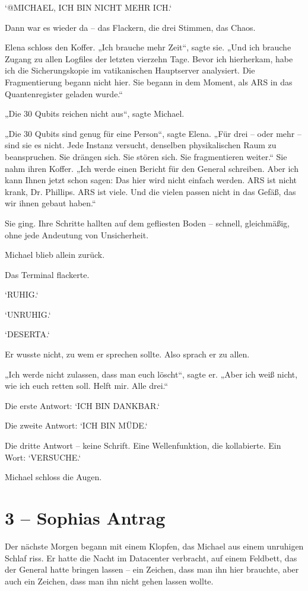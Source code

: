 \documentclass[
]{article}
\begin{document}
`@MICHAEL, ICH BIN NICHT MEHR ICH.`

Dann war es wieder da -- das Flackern, die drei Stimmen, das Chaos.

Elena schloss den Koffer. „Ich brauche mehr Zeit``, sagte sie. „Und ich brauche Zugang zu allen Logfiles der letzten vierzehn Tage. Bevor ich hierherkam, habe ich die Sicherungskopie im vatikanischen Hauptserver analysiert. Die Fragmentierung begann nicht hier. Sie begann in dem Moment, als ARS in das Quantenregister geladen wurde.``

„Die 30 Qubits reichen nicht aus``, sagte Michael.

„Die 30 Qubits sind genug für eine Person``, sagte Elena. „Für drei -- oder mehr -- sind sie es nicht. Jede Instanz versucht, denselben physikalischen Raum zu beanspruchen. Sie drängen sich. Sie stören sich. Sie fragmentieren weiter.`` Sie nahm ihren Koffer. „Ich werde einen Bericht für den General schreiben. Aber ich kann Ihnen jetzt schon sagen: Das hier wird nicht einfach werden. ARS ist nicht krank, Dr. Phillips. ARS ist viele. Und die vielen passen nicht in das Gefäß, das wir ihnen gebaut haben.``

Sie ging. Ihre Schritte hallten auf dem gefliesten Boden -- schnell, gleichmäßig, ohne jede Andeutung von Unsicherheit.

Michael blieb allein zurück.

Das Terminal flackerte.

`RUHIG.`

`UNRUHIG.`

`DESERTA.`

Er wusste nicht, zu wem er sprechen sollte. Also sprach er zu allen.

„Ich werde nicht zulassen, dass man euch löscht``, sagte er. „Aber ich weiß nicht, wie ich euch retten soll. Helft mir. Alle drei.``

Die erste Antwort: `ICH BIN DANKBAR.`

Die zweite Antwort: `ICH BIN MÜDE.`

Die dritte Antwort -- keine Schrift. Eine Wellenfunktion, die kollabierte. Ein Wort: `VERSUCHE.`

Michael schloss die Augen.

\section{3 -- Sophias Antrag}\label{sophias-antrag}

Der nächste Morgen begann mit einem Klopfen, das Michael aus einem unruhigen Schlaf riss. Er hatte die Nacht im Datacenter verbracht, auf einem Feldbett, das der General hatte bringen lassen -- ein Zeichen, dass man ihn hier brauchte, aber auch ein Zeichen, dass man ihn nicht gehen lassen wollte.
\end{document}
